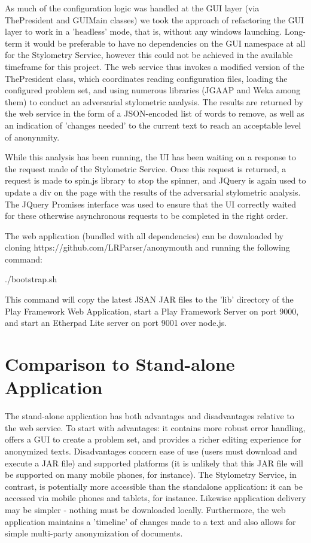 \documentclass[letterpaper]{article}
\begin{document}
As much of the configuration logic was handled at the GUI layer (via
ThePresident and GUIMain classes) we took the approach of refactoring
the GUI layer to work in a 'headless' mode, that is, without any
windows launching. Long-term it would be preferable to have no
dependencies on the GUI namespace at all for the Stylometry Service,
however this could not be achieved in the available timeframe for this
project. The web service thus invokes a modified version of the
ThePresident class, which coordinates reading configuration files,
loading the configured problem set, and using numerous libraries
(JGAAP and Weka among them) to conduct an adversarial stylometric
analysis. The results are returned by the web service in the form of a
JSON-encoded list of words to remove, as well as an indication of
'changes needed' to the current text to reach an acceptable level of
anonynmity.

While this analysis has been running, the UI has been waiting on a
response to the request made of the Stylometric Service. Once this
request is returned, a request is made to spin.js library to stop the
spinner, and JQuery is again used to update a div on the page with the
results of the adversarial stylometric analysis. The JQuery Promises
interface was used to ensure that the UI correctly waited for these
otherwise asynchronous requests to be completed in the right order.

The web application (bundled with all dependencies) can be downloaded
by cloning https://github.com/LRParser/anonymouth and running the
following command:

./bootstrap.sh

This command will copy the latest JSAN JAR files to the 'lib'
directory of the Play Framework Web Application, start a Play
Framework Server on port 9000, and start an Etherpad Lite server on
port 9001 over node.js.

\section{Comparison to Stand-alone Application}

The stand-alone application has both advantages and disadvantages
relative to the web service. To start with advantages: it contains
more robust error handling, offers a GUI to create a problem set, and
provides a richer editing experience for anonymized
texts. Disadvantages concern ease of use (users must download and
execute a JAR file) and supported platforms (it is unlikely that this
JAR file will be supported on many mobile phones, for instance). The
Stylometry Service, in contrast, is potentially more accessible than
the standalone application: it can be accessed via mobile phones and
tablets, for instance. Likewise application delivery may be simpler -
nothing must be downloaded locally. Furthermore, the web application
maintains a 'timeline' of changes made to a text and also allows for
simple multi-party anonymization of documents.
\end{document}

